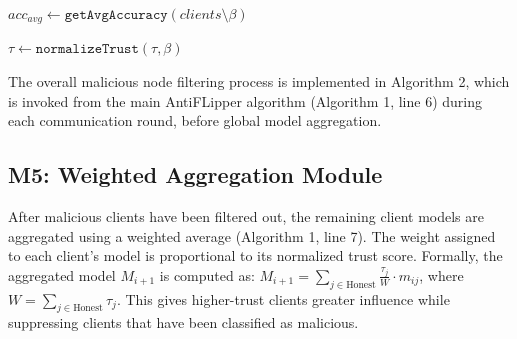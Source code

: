 \documentclass[conference]{IEEEtran}
\begin{document}
\IncMargin{1em}
\setlength{\textfloatsep}{0pt}
\begin{algorithm}[t]
  \caption{\texttt{MalNodeFilter()}}\label{alg:malfilter}
  \Indm 
  \Indp
  \BlankLine
  
  $acc_{avg} \leftarrow \texttt{getAvgAccuracy}(clients \setminus \beta)$\\
  

  
      
    
  
  $\tau \leftarrow \texttt{normalizeTrust}(\tau, \beta)$\\

\end{algorithm}
\DecMargin{1em}
The overall malicious node filtering process is implemented in Algorithm 2, which is invoked from the main AntiFLipper algorithm (Algorithm 1, line 6) during each communication round, before global model aggregation.


 \subsection{M5: Weighted Aggregation Module}
After malicious clients have been filtered out, the remaining client models are aggregated using a weighted average (Algorithm 1, line 7). The weight assigned to each client's model is proportional to its normalized trust score. Formally, the aggregated model $M_{i+1}$ is computed as: \(
M_{i+1} = \sum_{j \in \text{Honest}} \frac{\tau_j}{W} \cdot m_{ij} \), where $W = \sum_{j \in \text{Honest}} \tau_j$. This gives higher-trust clients greater influence while suppressing clients that have been classified as malicious.
\end{document}
